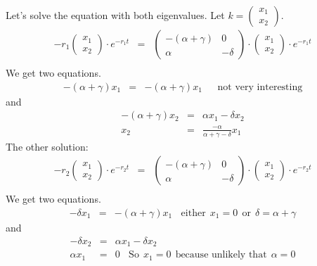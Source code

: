 \documentclass[10pt, a4paper]{article}
\begin{document}
Let's solve the equation with both eigenvalues. Let $k = \begin{pmatrix} x_1 \\ x_2  \end{pmatrix}$. 
\begin{eqnarray*}
-r_1 \begin{pmatrix} x_1 \\ x_2  \end{pmatrix} \cdot e^{-r_1t} &=& 
\begin{pmatrix}
-(\alpha + \gamma) & 0 \\
\alpha & -\delta 
\end{pmatrix} 
\cdot \begin{pmatrix} x_1 \\ x_2  \end{pmatrix} \cdot e^{-r_1t} \\
\end{eqnarray*}
We get two equations. 
\begin{eqnarray*}
-(\alpha + \gamma)x_1 &=& -(\alpha + \gamma)x_1  \:\:\:\:\:\:\: \text{not very interesting} 
\end{eqnarray*}
and 
\begin{eqnarray*}
-(\alpha + \gamma)x_2 &=& \alpha x_1 - \delta x_2 \\
x_2 &=& \frac{-\alpha}{\alpha + \gamma - \delta}x_1 
\end{eqnarray*}
The other solution: 
\begin{eqnarray*}
-r_2 \begin{pmatrix} x_1 \\ x_2  \end{pmatrix} \cdot e^{-r_2t} &=& 
\begin{pmatrix}
-(\alpha + \gamma) & 0 \\
\alpha & -\delta 
\end{pmatrix} 
\cdot \begin{pmatrix} x_1 \\ x_2  \end{pmatrix} \cdot e^{-r_2t} \\
\end{eqnarray*}
We get two equations. 
\begin{eqnarray*}
-\delta x_1 &=& -(\alpha + \gamma)x_1  \:\:\:\: \text{either}\:\: x_1 = 0 \:\: \text{or} \:\: \delta = \alpha + \gamma
\end{eqnarray*}
and 
\begin{eqnarray*}
-\delta x_2 &=& \alpha x_1 - \delta x_2 \\
\alpha x_1 &=& 0 \:\:\:\: \text{So} \:\ x_1 = 0 \:\ \text{because unlikely that} \:\ \alpha = 0 
\end{eqnarray*}
\end{document}

